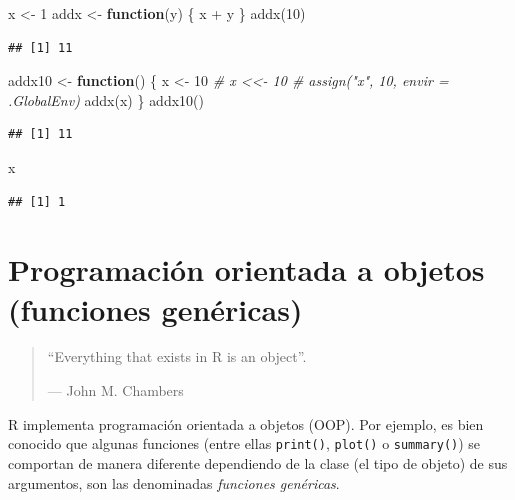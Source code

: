 \documentclass[
]{book}
\newenvironment{Shaded}{\begin{snugshade}}{\end{snugshade}}
\newcommand{\CommentTok}[1]{\textcolor[rgb]{0.56,0.35,0.01}{\textit{#1}}}
\newcommand{\ControlFlowTok}[1]{\textcolor[rgb]{0.13,0.29,0.53}{\textbf{#1}}}
\newcommand{\DecValTok}[1]{\textcolor[rgb]{0.00,0.00,0.81}{#1}}
\newcommand{\FunctionTok}[1]{\textcolor[rgb]{0.00,0.00,0.00}{#1}}
\newcommand{\NormalTok}[1]{#1}
\newcommand{\OtherTok}[1]{\textcolor[rgb]{0.56,0.35,0.01}{#1}}
\newcommand{\SpecialCharTok}[1]{\textcolor[rgb]{0.00,0.00,0.00}{#1}}
\theoremstyle{break}
\theoremstyle{nonumberplain}
\begin{document}
\begin{Shaded}
\begin{Highlighting}[]
\NormalTok{x }\OtherTok{\textless{}{-}} \DecValTok{1}
\NormalTok{addx }\OtherTok{\textless{}{-}} \ControlFlowTok{function}\NormalTok{(y) \{}
\NormalTok{  x }\SpecialCharTok{+}\NormalTok{ y}
\NormalTok{\}}
\FunctionTok{addx}\NormalTok{(}\DecValTok{10}\NormalTok{)}
\end{Highlighting}
\end{Shaded}

\begin{verbatim}
## [1] 11
\end{verbatim}

\begin{Shaded}
\begin{Highlighting}[]
\NormalTok{addx10 }\OtherTok{\textless{}{-}} \ControlFlowTok{function}\NormalTok{() \{}
\NormalTok{  x }\OtherTok{\textless{}{-}} \DecValTok{10}   \CommentTok{\# x \textless{}\textless{}{-} 10   \# assign("x", 10, envir = .GlobalEnv)}
  \FunctionTok{addx}\NormalTok{(x)}
\NormalTok{\}}
\FunctionTok{addx10}\NormalTok{()}
\end{Highlighting}
\end{Shaded}

\begin{verbatim}
## [1] 11
\end{verbatim}

\begin{Shaded}
\begin{Highlighting}[]
\NormalTok{x}
\end{Highlighting}
\end{Shaded}

\begin{verbatim}
## [1] 1
\end{verbatim}

\hypertarget{oop}{%
\section{Programación orientada a objetos (funciones genéricas)}\label{oop}}

\begin{quote}
``Everything that exists in R is an object''.

--- John M. Chambers
\end{quote}

R implementa programación orientada a objetos (OOP).
Por ejemplo, es bien conocido que algunas funciones (entre ellas \texttt{print()}, \texttt{plot()} o \texttt{summary()}) se comportan de manera diferente dependiendo de la clase (el tipo de objeto) de sus argumentos, son las denominadas \emph{funciones genéricas}.
\end{document}
